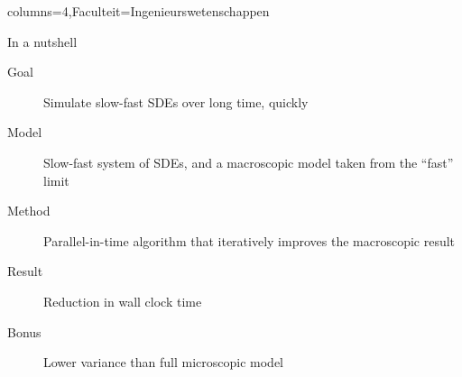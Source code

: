 \documentclass[landscape,a0paper,fontscale=0.45]{kuleuvenposter}
\begin{document}
\begin{poster}{columns=4,Faculteit=Ingenieurswetenschappen}
%
\begin{posterbox}%
[name=micro-macro modelling, column=0, row=0, boxColorOne=KULeuvenFaculteit!15!white, borderColor=KULeuvenFaculteit]%
{In a nutshell}%
\begin{description}
\item[Goal] Simulate slow-fast SDEs over long time, quickly
\item[Model] Slow-fast system of SDEs, and a macroscopic model taken from the ``fast'' limit
\item[Method] Parallel-in-time algorithm that iteratively improves the macroscopic result
\item[Result] Reduction in wall clock time
\item[Bonus] Lower variance than full microscopic model
\end{description}
\end{posterbox}


\end{poster}
\end{document}
